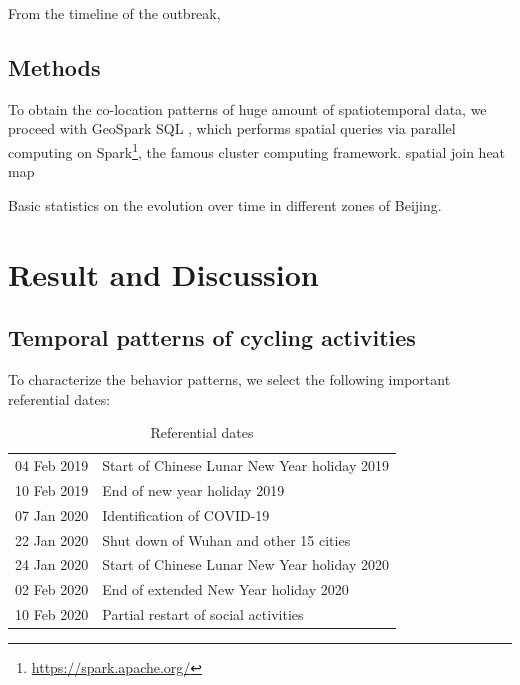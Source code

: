 \documentclass[preprints,ijgi,submit,moreauthors]{Definitions/mdpi}
\begin{document}
From the timeline \cite{li2020early} of the outbreak, 

\subsection{Methods}
To obtain the co-location patterns of huge amount of spatiotemporal data, we proceed with GeoSpark SQL \cite{huang2017geospark}, which performs spatial queries via parallel computing on Spark\footnote{\url{https://spark.apache.org/}}, the famous cluster computing framework.
spatial join 
heat map

Basic statistics on the evolution over time in different zones of Beijing. 

\section{Result and Discussion}
\subsection{Temporal patterns of cycling activities}
To characterize the behavior patterns, we select the following important referential dates: 

\begin{table}[H]
    \centering
    \begin{tabular}{ll}
    04 Feb 2019 & Start of Chinese Lunar New Year holiday 2019 \\
    10 Feb 2019 & End of new year holiday 2019\\
    07 Jan 2020 & Identification of COVID-19\\
    22 Jan 2020 & Shut down of Wuhan and other 15 cities\\
    24 Jan 2020 & Start of Chinese Lunar New Year holiday 2020\\
    02 Feb 2020 & End of extended New Year holiday 2020\\
    10 Feb 2020 & Partial restart of social activities
    \end{tabular}
    \caption{Referential dates}
    \label{tab:my_label}
\end{table}


\end{document}

